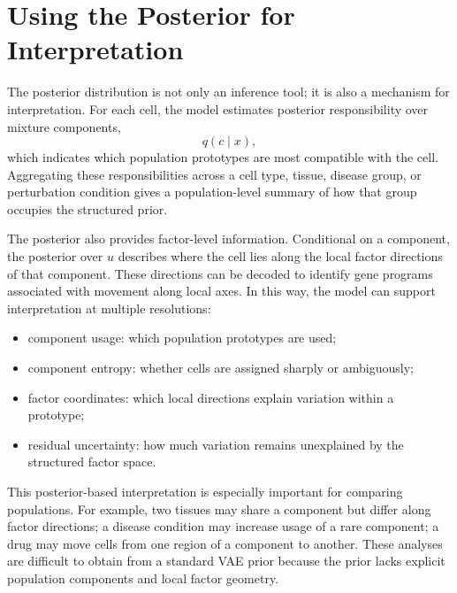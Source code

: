 \documentclass[11pt]{article}
\begin{document}
\section{Using the Posterior for Interpretation}

The posterior distribution is not only an inference tool; it is also a mechanism for interpretation. For each cell, the model estimates posterior responsibility over mixture components,
\begin{equation}
    q(c \mid x),
\end{equation}
which indicates which population prototypes are most compatible with the cell. Aggregating these responsibilities across a cell type, tissue, disease group, or perturbation condition gives a population-level summary of how that group occupies the structured prior.

The posterior also provides factor-level information. Conditional on a component, the posterior over $u$ describes where the cell lies along the local factor directions of that component. These directions can be decoded to identify gene programs associated with movement along local axes. In this way, the model can support interpretation at multiple resolutions:
\begin{itemize}
    \item component usage: which population prototypes are used;
    \item component entropy: whether cells are assigned sharply or ambiguously;
    \item factor coordinates: which local directions explain variation within a prototype;
    \item residual uncertainty: how much variation remains unexplained by the structured factor space.
\end{itemize}

This posterior-based interpretation is especially important for comparing populations. For example, two tissues may share a component but differ along factor directions; a disease condition may increase usage of a rare component; a drug may move cells from one region of a component to another. These analyses are difficult to obtain from a standard VAE prior because the prior lacks explicit population components and local factor geometry.
\end{document}
